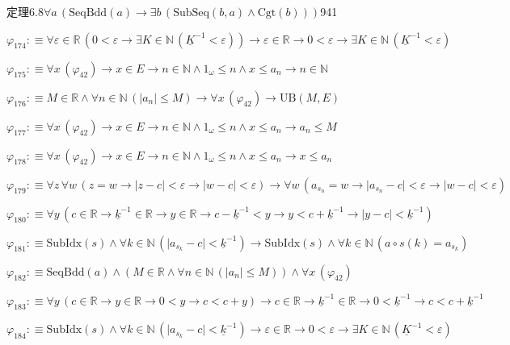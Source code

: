 \begin{fullproof}{定理6.8}{$\forall a\,(\mathrm{SeqBdd}(a) \to \exists b\,(\mathrm{SubSeq}(b,a) \land \mathrm{Cgt}(b)))$}{941}
\begin{abbrevlist}
\item $\varphi_{174} :\equiv \forall \varepsilon \in \mathbb{R}\,(0 < \varepsilon \to \exists K \in \mathbb{N}\,(\underline{K}^{-1} < \varepsilon)) \to \varepsilon \in \mathbb{R} \to 0 < \varepsilon \to \exists K \in \mathbb{N}\,(\underline{K}^{-1} < \varepsilon)$
\item $\varphi_{175} :\equiv \forall x\,(\varphi_{42}) \to x \in E \to n \in \mathbb{N} \land 1_{\omega} \leq n \land x \leq a_{n} \to n \in \mathbb{N}$
\item $\varphi_{176} :\equiv M \in \mathbb{R} \land \forall n \in \mathbb{N}\,(\lvert a_{n} \rvert \leq M) \to \forall x\,(\varphi_{42}) \to \mathrm{UB}(M,E)$
\item $\varphi_{177} :\equiv \forall x\,(\varphi_{42}) \to x \in E \to n \in \mathbb{N} \land 1_{\omega} \leq n \land x \leq a_{n} \to a_{n} \leq M$
\item $\varphi_{178} :\equiv \forall x\,(\varphi_{42}) \to x \in E \to n \in \mathbb{N} \land 1_{\omega} \leq n \land x \leq a_{n} \to x \leq a_{n}$
\item $\varphi_{179} :\equiv \forall z\,\forall w\,(z = w \to \lvert z - c \rvert < \varepsilon \to \lvert w - c \rvert < \varepsilon) \to \forall w\,(a_{s_{n}} = w \to \lvert a_{s_{n}} - c \rvert < \varepsilon \to \lvert w - c \rvert < \varepsilon)$
\item $\varphi_{180} :\equiv \forall y\,(c \in \mathbb{R} \to \underline{k}^{-1} \in \mathbb{R} \to y \in \mathbb{R} \to c - \underline{k}^{-1} < y \to y < c + \underline{k}^{-1} \to \lvert y - c \rvert < \underline{k}^{-1})$
\item $\varphi_{181} :\equiv \mathrm{SubIdx}(s) \land \forall k \in \mathbb{N}\,(\lvert a_{s_{k}} - c \rvert < \underline{k}^{-1}) \to \mathrm{SubIdx}(s) \land \forall k \in \mathbb{N}\,(a \circ s(k) = a_{s_{k}})$
\item $\varphi_{182} :\equiv \mathrm{SeqBdd}(a) \land (M \in \mathbb{R} \land \forall n \in \mathbb{N}\,(\lvert a_{n} \rvert \leq M)) \land \forall x\,(\varphi_{42})$
\item $\varphi_{183} :\equiv \forall y\,(c \in \mathbb{R} \to y \in \mathbb{R} \to 0 < y \to c < c + y) \to c \in \mathbb{R} \to \underline{k}^{-1} \in \mathbb{R} \to 0 < \underline{k}^{-1} \to c < c + \underline{k}^{-1}$
\item $\varphi_{184} :\equiv \mathrm{SubIdx}(s) \land \forall k \in \mathbb{N}\,(\lvert a_{s_{k}} - c \rvert < \underline{k}^{-1}) \to \varepsilon \in \mathbb{R} \to 0 < \varepsilon \to \exists K \in \mathbb{N}\,(\underline{K}^{-1} < \varepsilon)$

\end{abbrevlist}
\end{fullproof}
